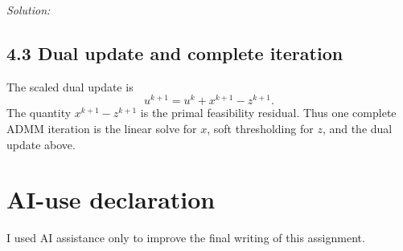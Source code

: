 \documentclass[a4paper,11pt]{article}
\newenvironment{solution}{\textit{Solution:}}{}
\begin{document}
\begin{solution}
\subsection*{4.3 Dual update and complete iteration}
The scaled dual update is
\[
\boxed{u^{k+1}=u^k+x^{k+1}-z^{k+1}.}
\]
The quantity $x^{k+1}-z^{k+1}$ is the primal feasibility residual. Thus one complete ADMM
iteration is the linear solve for $x$, soft thresholding for $z$, and the dual update above.

\end{solution}

\section*{AI-use declaration}
I used AI assistance only to improve the final writing of this assignment.
\end{document}
